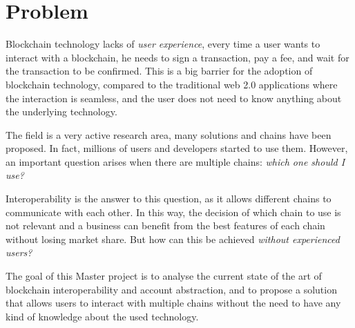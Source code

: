 \chapter{Problem}
\label{chap:problem}

Blockchain technology lacks of \textit{user experience}, every time a user wants to interact with a blockchain, he needs to sign a transaction, pay a fee, and wait for the transaction to be confirmed. This is a big barrier for the adoption of blockchain technology, compared to the traditional web 2.0 applications where the interaction is seamless, and the user does not need to know anything about the underlying technology. 

The field is a very active research area, many solutions and chains have been proposed. In fact, millions of users and developers started to use them. \cite{blockchain-statistics} However, an important question arises when there are multiple chains: \textit{which one should I use?}

Interoperability is the answer to this question, as it allows different chains to communicate with each other. In this way, the decision of which chain to use is not relevant and a business can benefit from the best features of each chain without losing market share. But how can this be achieved \textit{without experienced users?}

The goal of this Master project is to analyse the current state of the art of blockchain interoperability and account abstraction, and to propose a solution that allows users to interact with multiple chains without the need to have any kind of knowledge about the used technology.